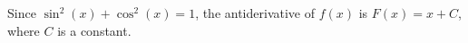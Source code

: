 Since $\sin^2(x) + \cos^2(x) = 1$, the antiderivative of $f(x)$ is $F(x) = x + C$, where $C$ is a constant.
